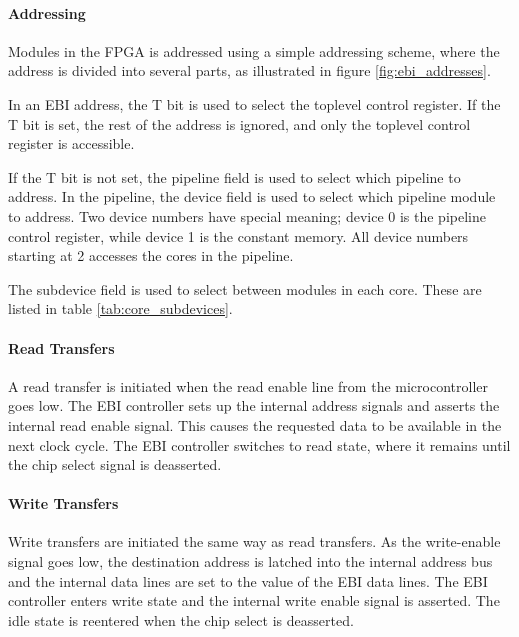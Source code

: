 

\FloatBarrier
\paragraph{Addressing}

Modules in the FPGA is addressed using a simple addressing scheme, where the
address is divided into several parts, as illustrated in figure \ref{fig:ebi_addresses}.



In an EBI address, the T bit is used to select the toplevel control register.
If the T bit is set, the rest of the address is ignored, and only the toplevel
control register is accessible.

If the T bit is not set, the pipeline field is used to select which pipeline
to address. In the pipeline, the device field is used to select
which pipeline module to address. Two device numbers have special meaning;
device 0 is the pipeline control register, while device 1 is the constant
memory. All device numbers starting at 2 accesses the cores in the pipeline.

The subdevice field is used to select between modules in each core. These
are listed in table \ref{tab:core_subdevices}.



\FloatBarrier
\paragraph{Read Transfers}

A read transfer is initiated when the read enable line from the microcontroller
goes low. The EBI controller sets up the internal address signals and asserts
the internal read enable signal. This causes the requested data to be available
in the next clock cycle. The EBI controller switches to read state, where it
remains until the chip select signal is deasserted.

\paragraph{Write Transfers}

Write transfers are initiated the same way as read transfers. As the
write-enable signal goes low, the destination address is latched into the
internal address bus and the internal data lines are set to the value of the
EBI data lines. The EBI controller enters write state and the internal
write enable signal is asserted. The idle state is reentered when the chip
select is deasserted.

